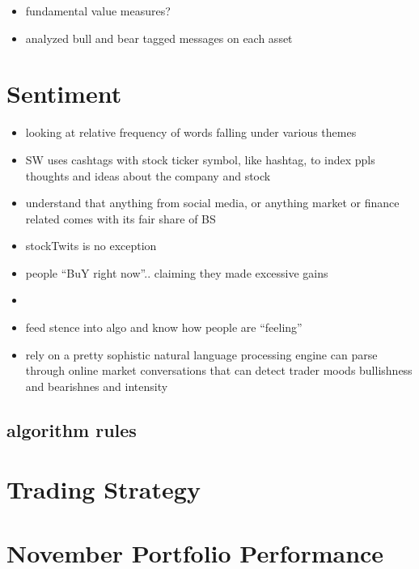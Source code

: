 \documentclass[11pt,]{article}
\providecommand{\tightlist}{%
\setlength{\itemsep}{0pt}\setlength{\parskip}{0pt}}
\begin{document}
\begin{itemize}
\tightlist
\item
  fundamental value measures?
\item
  analyzed bull and bear tagged messages on each asset
\end{itemize}

\section{Sentiment}\label{sentiment}

\begin{itemize}
\item
  looking at relative frequency of words falling under various themes
\item
  SW uses cashtags with stock ticker symbol, like hashtag, to index ppls
  thoughts and ideas about the company and stock
\item
  understand that anything from social media, or anything market or
  finance related comes with its fair share of BS
\item
  stockTwits is no exception
\item
  people ``BuY right now''.. claiming they made excessive gains
\item
\item
  feed stence into algo and know how people are ``feeling''
\item
  rely on a pretty sophistic natural language processing engine can
  parse through online market conversations that can detect trader moods
  bullishness and bearishnes and intensity
\end{itemize}

\subsection{algorithm rules}\label{algorithm-rules}

\section{}\label{section}

\section{Trading Strategy}\label{trading-strategy-1}

\section{November Portfolio
Performance}\label{november-portfolio-performance}
\end{document}

